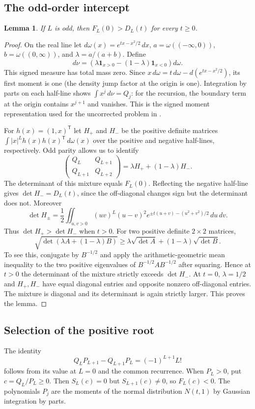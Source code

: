 \documentclass[11pt,a4paper]{article}
\numberwithin{equation}{section}
\newtheorem{lemma}[theorem]{Lemma}
\theoremstyle{definition}
\theoremstyle{remark}
\begin{document}
\subsection{The odd-order intercept}
\begin{lemma}
If $L$ is odd, then $F_L(0)>D_L(t)$ for every $t\ge0$.
\end{lemma}
\begin{proof}
On the real line let $d\omega(x)=e^{tx-x^2/2}\,dx$, $a=\omega((-\infty,0))$, $b=\omega((0,\infty))$, and $\lambda=a/(a+b)$. Define
\[
 d\nu=\left(\lambda\mathbf 1_{x>0}-(1-\lambda)\mathbf 1_{x<0}\right)d\omega.
\]
This signed measure has total mass zero. Since $x\,d\omega=t\,d\omega-d(e^{tx-x^2/2})$, its first moment is one (the density jump factor at the origin is one). Integration by parts on each half-line shows
$\int x^j\,d\nu=Q_j$: for the recursion, the boundary term at the origin contains $x^{j+1}$ and vanishes. This is the signed moment representation used for the uncorrected problem in \cite{r35showa:r34}.

For $h(x)=(1,x)^{\mathsf T}$ let $H_+$ and $H_-$ be the positive definite matrices
$\int |x|^L h(x)h(x)^{\mathsf T}\,d\omega(x)$ over the positive and negative half-lines, respectively. Odd parity allows us to identify
\[
 \begin{pmatrix}Q_L&Q_{L+1}\\Q_{L+1}&Q_{L+2}\end{pmatrix}
 =\lambda H_+ +(1-\lambda)H_- .
\]
The determinant of this mixture equals $F_L(0)$. Reflecting the negative half-line gives $\det H_-=D_L(t)$, since the off-diagonal changes sign but the determinant does not. Moreover
\[
 \det H_{\pm}=\frac12\iint_{u,v>0}
 (uv)^L(u-v)^2 e^{\pm t(u+v)-(u^2+v^2)/2}\,du\,dv .
\]
Thus $\det H_+>\det H_-$ when $t>0$. For two positive definite $2\times2$ matrices,
\[
 \sqrt{\det(\lambda A+(1-\lambda)B)}\ge
 \lambda\sqrt{\det A}+(1-\lambda)\sqrt{\det B}.
\]
To see this, conjugate by $B^{-1/2}$ and apply the arithmetic-geometric mean inequality to the two positive eigenvalues of $B^{-1/2}AB^{-1/2}$ after squaring. Hence at $t>0$ the determinant of the mixture strictly exceeds $\det H_-$. At $t=0$, $\lambda=1/2$ and $H_+,H_-$ have equal diagonal entries and opposite nonzero off-diagonal entries. The mixture is diagonal and its determinant is again strictly larger. This proves the lemma.
\end{proof}

\subsection{Selection of the positive root}
The identity
\[
 Q_LP_{L+1}-Q_{L+1}P_L=(-1)^{L+1}L!
\]
follows from its value at $L=0$ and the common recurrence. When $P_L>0$, put $c=Q_L/P_L\ge0$. Then $S_L(c)=0$ but $S_{L+1}(c)\ne0$, so $F_L(c)<0$. The polynomials $P_j$ are the moments of the normal distribution $N(t,1)$ by Gaussian integration by parts.
\end{document}
